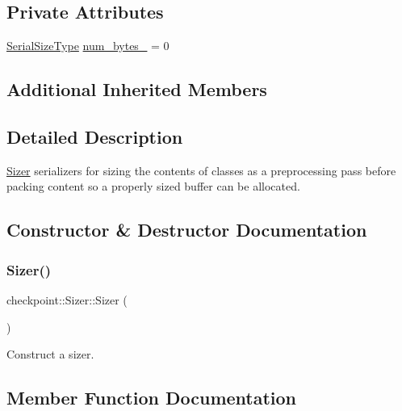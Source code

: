\subsection*{Private Attributes}
\begin{DoxyCompactItemize}
\item 
\hyperlink{namespacecheckpoint_a083f6674da3f94c2901b18c6d238217c}{Serial\+Size\+Type} \hyperlink{structcheckpoint_1_1_sizer_a94e13ec6a5656d3b82dc787c00390bf2}{num\+\_\+bytes\+\_\+} = 0
\end{DoxyCompactItemize}
\subsection*{Additional Inherited Members}


\subsection{Detailed Description}
\hyperlink{structcheckpoint_1_1_sizer}{Sizer} serializers for sizing the contents of classes as a preprocessing pass before packing content so a properly sized buffer can be allocated. 

\subsection{Constructor \& Destructor Documentation}
\mbox{\label{structcheckpoint_1_1_sizer_a17995329af9eec00859e86c6fabf4890}} 
\subsubsection{\texorpdfstring{Sizer()}{Sizer()}}
{\footnotesize\ttfamily checkpoint\+::\+Sizer\+::\+Sizer (\begin{DoxyParamCaption}{ }\end{DoxyParamCaption})}



Construct a sizer. 



\subsection{Member Function Documentation}
\mbox{\label{structcheckpoint_1_1_sizer_a1141bde0fae75fd8be9ad5187876594d}} 
